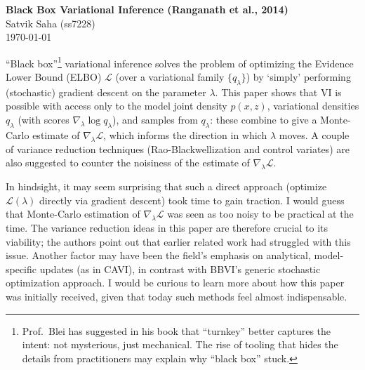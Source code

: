 \documentclass[12pt]{article}
\begin{document}
\begin{flushleft}
\textbf{Black Box Variational Inference (Ranganath et al., 2014)} \\
Satvik Saha (ss7228) \\
\today
\end{flushleft}

\vspace{0.1in}

``Black box''\footnote{%
    Prof.\ Blei has suggested in his book that ``turnkey'' better captures the
    intent: not mysterious, just mechanical.
    The rise of tooling that hides the details from practitioners may explain
    why ``black box'' stuck.
} variational inference solves the problem of optimizing the Evidence Lower
Bound (ELBO) $\mathcal{L}$ (over a variational family $\{q_\lambda\}$) by
`simply' performing (stochastic) gradient descent on the parameter $\lambda$.
This paper shows that VI is possible with access only to the model joint
density $p(x, z)$, variational densities $q_\lambda$ (with scores
$\nabla_\lambda \log{q_\lambda}$), and samples from $q_\lambda$: these combine
to give a Monte-Carlo estimate of $\nabla_\lambda \mathcal{L}$, which informs
the direction in which $\lambda$ moves.
A couple of variance reduction techniques (Rao-Blackwellization and control
variates) are also suggested to counter the noisiness of the estimate of
$\nabla_\lambda \mathcal{L}$.

In hindsight, it may seem surprising that such a direct approach (optimize
$\mathcal{L}(\lambda)$ directly via gradient descent) took time to gain
traction.
I would guess that Monte-Carlo estimation of $\nabla_\lambda\mathcal{L}$ was
seen as too noisy to be practical at the time.
The variance reduction ideas in this paper are therefore crucial to its
viability; the authors point out that earlier related work had struggled with
this issue.
Another factor may have been the field's emphasis on analytical, model-specific
updates (as in CAVI), in contrast with BBVI's generic stochastic optimization
approach.
I would be curious to learn more about how this paper was initially received,
given that today such methods feel almost indispensable.

% 
% 
\end{document}
